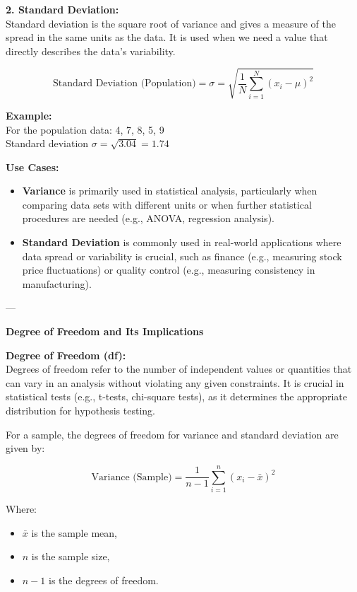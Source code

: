 \documentclass[12pt,a4paper]{book}
\begin{document}
\vspace{0.5cm}

\textbf{2. Standard Deviation:} \\
Standard deviation is the square root of variance and gives a measure of the spread in the same units as the data. It is used when we need a value that directly describes the data's variability.

\[
\text{Standard Deviation (Population)} = \sigma = \sqrt{\frac{1}{N} \sum_{i=1}^{N} (x_i - \mu)^2}
\]

\textbf{Example:} \\
For the population data: 4, 7, 8, 5, 9 \\
Standard deviation \( \sigma = \sqrt{3.04} = 1.74 \)

\vspace{0.5cm}

\textbf{Use Cases:}
\begin{itemize}
    \item \textbf{Variance} is primarily used in statistical analysis, particularly when comparing data sets with different units or when further statistical procedures are needed (e.g., ANOVA, regression analysis).
    \item \textbf{Standard Deviation} is commonly used in real-world applications where data spread or variability is crucial, such as finance (e.g., measuring stock price fluctuations) or quality control (e.g., measuring consistency in manufacturing).
\end{itemize}

---

\textbf{Degree of Freedom and Its Implications}

\vspace{0.5cm}

\textbf{Degree of Freedom (df):} \\
Degrees of freedom refer to the number of independent values or quantities that can vary in an analysis without violating any given constraints. It is crucial in statistical tests (e.g., t-tests, chi-square tests), as it determines the appropriate distribution for hypothesis testing.

For a sample, the degrees of freedom for variance and standard deviation are given by:

\[
\text{Variance (Sample)} = \frac{1}{n-1} \sum_{i=1}^{n} (x_i - \bar{x})^2
\]

Where:
\begin{itemize}
    \item \( \bar{x} \) is the sample mean,
    \item \( n \) is the sample size,
    \item \( n-1 \) is the degrees of freedom.
\end{itemize}
\end{document}
